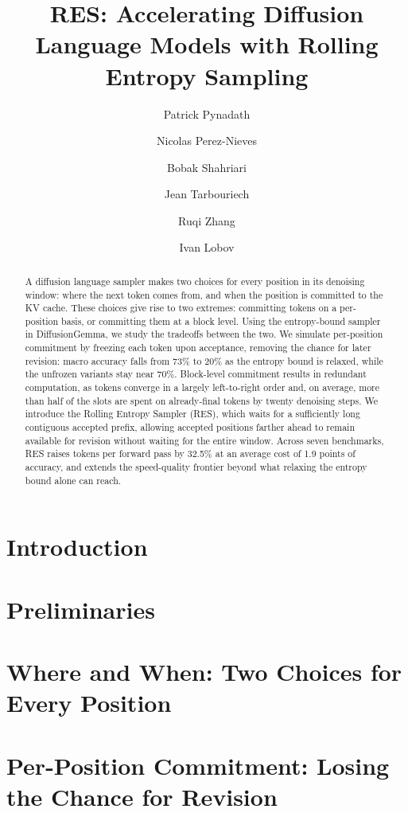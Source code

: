 \documentclass[11pt, a4paper, logo, copyright, gdm]{google}
\title{RES: Accelerating Diffusion Language Models with Rolling Entropy Sampling}
\author[1,*]{Patrick Pynadath}
\author[2]{Nicolas Perez-Nieves}
\author[2]{Bobak Shahriari}
\author[2]{Jean Tarbouriech}
\author[1]{Ruqi Zhang}
\author[*]{Ivan Lobov}
\affil[1]{Purdue University}
\affil[2]{Google DeepMind}
\affil[*]{Work done while at Google DeepMind.}
\begin{document}
\newcommand{\algname}{RES}
\newcommand{\algabbrev}{RES}

\begin{abstract}
A diffusion language sampler makes two choices for every position in its denoising window: where the next token comes from, and when the position is committed to the KV cache.
These choices give rise to two extremes: committing tokens on a per-position basis, or committing them at a block level.
Using the entropy-bound sampler in DiffusionGemma, we study the tradeoffs between the two.
We simulate per-position commitment by freezing each token upon acceptance, removing the chance for later revision: macro accuracy falls from 73\% to 20\% as the entropy bound is relaxed, while the unfrozen variants stay near 70\%.
Block-level commitment results in redundant computation, as tokens converge in a largely left-to-right order and, on average, more than half of the slots are spent on already-final tokens by twenty denoising steps.
We introduce the Rolling Entropy Sampler (RES), which waits for a sufficiently long contiguous accepted prefix, allowing accepted positions farther ahead to remain available for revision without waiting for the entire window.
Across seven benchmarks, RES raises tokens per forward pass by 32.5\% at an average cost of 1.9 points of accuracy, and extends the speed-quality frontier beyond what relaxing the entropy bound alone can reach.
\end{abstract}

\maketitle

\section{Introduction}
\label{sec:intro}


\section{Preliminaries}
\label{sec:prelims}


\section{Where and When: Two Choices for Every Position}
\label{sec:motivation}


\section{Per-Position Commitment: Losing the Chance for Revision}
\label{sec:too-early}

\end{document}
